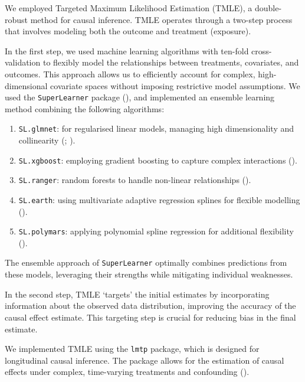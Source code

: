 \documentclass[
  single column]{article}
\providecommand{\tightlist}{%
  \setlength{\itemsep}{0pt}\setlength{\parskip}{0pt}}\usepackage{longtable,booktabs,array}
\begin{document}
We employed Targeted Maximum Likelihood Estimation (TMLE), a
double-robust method for causal inference. TMLE operates through a
two-step process that involves modeling both the outcome and treatment
(exposure).

In the first step, we used machine learning algorithms with ten-fold
cross-validation to flexibly model the relationships between treatments,
covariates, and outcomes. This approach allows us to efficiently account
for complex, high-dimensional covariate spaces without imposing
restrictive model assumptions. We used the \texttt{SuperLearner} package
(), and implemented an
ensemble learning method combining the following algorithms:

\begin{enumerate}
\def\labelenumi{\arabic{enumi}.}
\tightlist
\item
  \texttt{SL.glmnet}: for regularised linear models, managing high
  dimensionality and collinearity
  (;
  ).
\item
  \texttt{SL.xgboost}: employing gradient boosting to capture complex
  interactions ().
\item
  \texttt{SL.ranger}: random forests to handle non-linear relationships
  ().
\item
  \texttt{SL.earth}: using multivariate adaptive regression splines for
  flexible modelling ().
\item
  \texttt{SL.polymars}: applying polynomial spline regression for
  additional flexibility ().
\end{enumerate}

The ensemble approach of \texttt{SuperLearner} optimally combines
predictions from these models, leveraging their strengths while
mitigating individual weaknesses.

In the second step, TMLE `targets' the initial estimates by
incorporating information about the observed data distribution,
improving the accuracy of the causal effect estimate. This targeting
step is crucial for reducing bias in the final estimate.

We implemented TMLE using the \texttt{lmtp} package, which is designed
for longitudinal causal inference. The package allows for the estimation
of causal effects under complex, time-varying treatments and confounding
().
\end{document}
